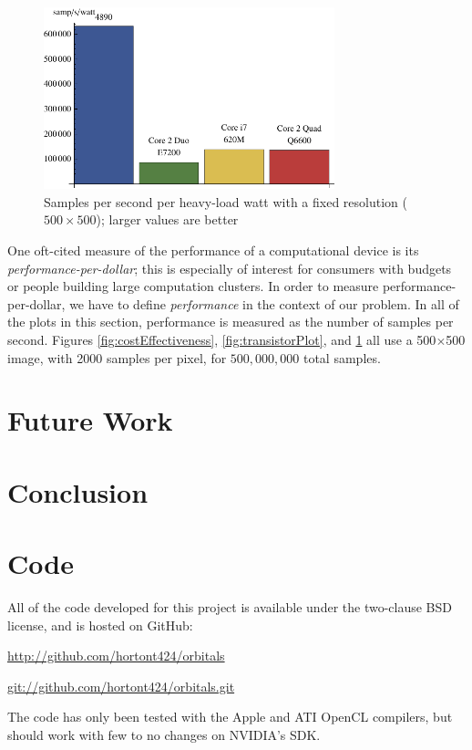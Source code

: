 \documentclass{acmsiggraph}
\begin{document}
\begin{figure}
    \includegraphics[width=84.5mm]{wattPlot.pdf}
    \caption{Samples per second per heavy-load watt with a fixed resolution ($500\times500$); larger values are better}
    \label{fig:wattPlot}
\end{figure}

One oft-cited measure of the performance of a computational device is its {\it performance-per-dollar}; this is especially of interest for consumers with budgets or people building large computation clusters. In order to measure performance-per-dollar, we have to define {\it performance} in the context of our problem. In all of the plots in this section, performance is measured as the number of samples per second. Figures \ref{fig:costEffectiveness}, \ref{fig:transistorPlot}, and \ref{fig:wattPlot} all use a 500$\times$500 image, with 2000 samples per pixel, for $500,000,000$ total samples.

\section{Future Work}

\section{Conclusion}

\section{Code}

All of the code developed for this project is available under the two-clause BSD license, and is hosted on GitHub:

\url{http://github.com/hortont424/orbitals}

\url{git://github.com/hortont424/orbitals.git}

The code has only been tested with the Apple and ATI OpenCL compilers, but should work with few to no changes on NVIDIA's SDK.


\nocite{*}

\end{document}
